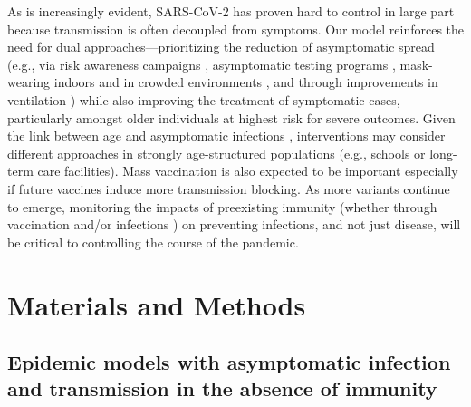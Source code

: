 \documentclass[12pt]{article}
\begin{document}
As is increasingly evident, SARS-CoV-2 has proven hard to control in large part because transmission is often decoupled from symptoms. 
Our model reinforces the need for dual approaches---prioritizing the reduction of asymptomatic spread (e.g., via risk awareness campaigns \cite{Bavel2020,chande2020real,sinclair2021pairing}, asymptomatic testing programs \cite{mina2021covid,gibson2022surv,Ranoa2022}, mask-wearing indoors and in crowded environments \cite{jones2020two,prather2020reducing,howard2021ev}, and through improvements in ventilation \cite{allen2021indoor,wang2021airborne}) while also improving the treatment of symptomatic cases, particularly amongst older individuals at highest risk for severe outcomes.
Given the link between age and asymptomatic infections \cite{davies2020}, interventions may consider different approaches in strongly age-structured populations (e.g., schools or long-term care facilities).
Mass vaccination is also expected to be important especially if future vaccines induce more transmission blocking.
As more variants continue to emerge, monitoring the impacts of preexisting immunity (whether through vaccination and/or infections  \cite{lopman2021framework}) on preventing infections, and not just disease, will be critical to controlling the course of the pandemic.

\section*{Materials and Methods}

\subsection*{Epidemic models with asymptomatic infection and transmission in the absence of immunity}
\end{document}
